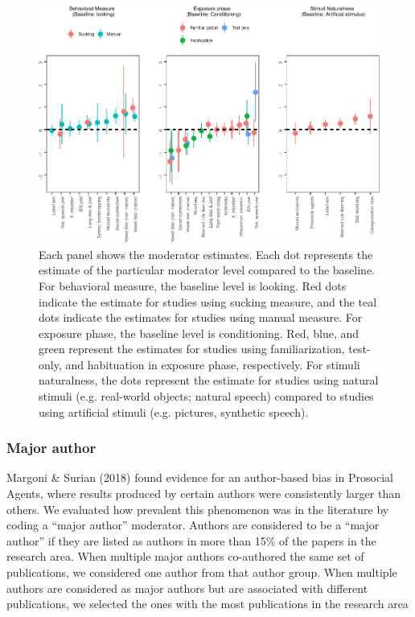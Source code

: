 \documentclass[10pt, letterpaper]{article}
\newenvironment{CodeChunk}{}{}
\begin{document}
\begin{CodeChunk}
\begin{figure}[t!]

{\centering \includegraphics{figs/mod_plot-1} 

}

\caption[Each panel shows the moderator estimates]{Each panel shows the moderator estimates. Each dot represents the estimate of the particular moderator level compared to the baseline. For behavioral measure, the baseline level is looking. Red dots indicate the estimate for studies using sucking measure, and the teal dots indicate the estimates for studies using manual measure. For exposure phase, the baseline level is conditioning. Red, blue, and green represent the estimates for studies using familiarization, test-only, and habituation in exposure phase, respectively. For stimuli naturalness, the dots represent the estimate for studies using natural stimuli (e.g. real-world objects; natural speech) compared to studies using artificial stimuli (e.g. pictures, synthetic speech).}\label{fig:mod_plot}
\end{figure}
\end{CodeChunk}

\hypertarget{major-author}{%
\subsubsection{Major author}\label{major-author}}

Margoni \& Surian (2018) found evidence for an author-based bias in
Prosocial Agents, where results produced by certain authors were
consistently larger than others. We evaluated how prevalent this
phenomenon was in the literature by coding a ``major author'' moderator.
Authors are considered to be a ``major author'' if they are listed as
authors in more than 15\% of the papers in the research area. When
multiple major authors co-authored the same set of publications, we
considered one author from that author group. When multiple authors are
considered as major authors but are associated with different
publications, we selected the ones with the most publications in the
research area
\end{document}
